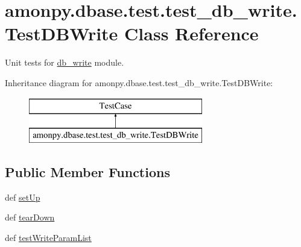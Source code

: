\hypertarget{classamonpy_1_1dbase_1_1test_1_1test__db__write_1_1_test_d_b_write}{\section{amonpy.\-dbase.\-test.\-test\-\_\-db\-\_\-write.\-Test\-D\-B\-Write Class Reference}
\label{classamonpy_1_1dbase_1_1test_1_1test__db__write_1_1_test_d_b_write}
}


Unit tests for \hyperlink{namespaceamonpy_1_1dbase_1_1db__write}{db\-\_\-write} module.  


Inheritance diagram for amonpy.\-dbase.\-test.\-test\-\_\-db\-\_\-write.\-Test\-D\-B\-Write\-:\begin{figure}[H]
\begin{center}
\leavevmode
\includegraphics[height=2.000000cm]{db/d42/classamonpy_1_1dbase_1_1test_1_1test__db__write_1_1_test_d_b_write}
\end{center}
\end{figure}
\subsection*{Public Member Functions}
\begin{DoxyCompactItemize}
\item 
def \hyperlink{classamonpy_1_1dbase_1_1test_1_1test__db__write_1_1_test_d_b_write_a8ef76286fea5446138811375fb7f66b5}{set\-Up}
\item 
def \hyperlink{classamonpy_1_1dbase_1_1test_1_1test__db__write_1_1_test_d_b_write_aa32d3bef1374ed78d24d9576db67efab}{tear\-Down}
\item 
def \hyperlink{classamonpy_1_1dbase_1_1test_1_1test__db__write_1_1_test_d_b_write_a02684496f0a6f809cc60ab8873b125c8}{test\-Write\-Param\-List}
\end{DoxyCompactItemize}
